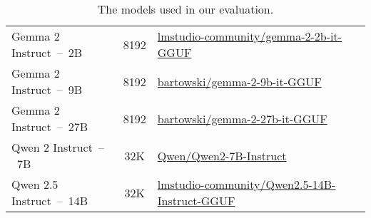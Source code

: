 \begin{table*}[t]
\begin{tabular}{lcl}
      Gemma 2 Instruct~--~2B              & 8192                       & \href{https://huggingface.co/lmstudio-community/gemma-2-2b-it-GGUF}{lmstudio-community/gemma-2-2b-it-GGUF} \\
      Gemma 2 Instruct~--~9B              & 8192                       & \href{https://huggingface.co/bartowski/gemma-2-9b-it-GGUF}{bartowski/gemma-2-9b-it-GGUF} \\
      Gemma 2 Instruct~--~27B             & 8192                       & \href{https://huggingface.co/bartowski/gemma-2-27b-it-GGUF}{bartowski/gemma-2-27b-it-GGUF} \\
      Qwen 2 Instruct~--~7B               & 32K                        & \href{https://huggingface.co/Qwen/Qwen2-7B-Instruct}{Qwen/Qwen2-7B-Instruct} \\
      Qwen 2.5 Instruct~--~14B            & 32K                        & \href{https://huggingface.co/lmstudio-community/Qwen2.5-14B-Instruct-GGUF}{lmstudio-community/Qwen2.5-14B-Instruct-GGUF} \\
      \hline
    \end{tabular}
    \caption{The models used in our evaluation.}\label{tab:models-appendix}
\end{table*}